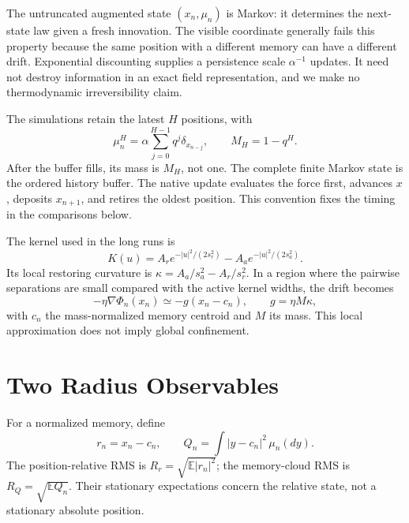 The untruncated augmented state $(x_n,\mu_n)$ is Markov: it determines the
next-state law given a fresh innovation. The visible coordinate generally
fails this property because the same position with a different memory can
have a different drift. Exponential discounting supplies a persistence
scale $\alpha^{-1}$ updates. It need not destroy information in an exact
field representation, and we make no thermodynamic irreversibility claim.

The simulations retain the latest $H$ positions, with
\begin{equation}
\mu_n^H=\alpha\sum_{j=0}^{H-1}q^j\delta_{x_{n-j}},\qquad
M_H=1-q^H.
\label{eq:finite_memory}
\end{equation}
After the buffer fills, its mass is $M_H$, not one. The complete finite
Markov state is the ordered history buffer. The native update evaluates
the force first, advances $x$, deposits $x_{n+1}$, and retires the oldest
position. This convention fixes the timing in the comparisons below.

The kernel used in the long runs is
\begin{equation}
K(u)=A_r e^{-|u|^2/(2s_r^2)}-A_a e^{-|u|^2/(2s_a^2)}.
\label{eq:kernel}
\end{equation}
Its local restoring curvature is
$\kappa=A_a/s_a^2-A_r/s_r^2$. In a region where the pairwise separations are
small compared with the active kernel widths, the drift becomes
\begin{equation}
-\eta\nabla\Phi_n(x_n)\simeq-g(x_n-c_n),
\qquad g=\eta M\kappa,
\label{eq:linear_force}
\end{equation}
with $c_n$ the mass-normalized memory centroid and $M$ its mass.
This local approximation does not imply global confinement.

\section{Two Radius Observables}
For a normalized memory, define
\begin{equation}
r_n=x_n-c_n,\qquad
Q_n=\int |y-c_n|^2\,\mu_n(dy).
\label{eq:observables}
\end{equation}
The position-relative RMS is $R_r=\sqrt{\mathbb E|r_n|^2}$; the
memory-cloud RMS is $R_Q=\sqrt{\mathbb E Q_n}$. Their stationary
expectations concern the relative state, not a stationary absolute position.

